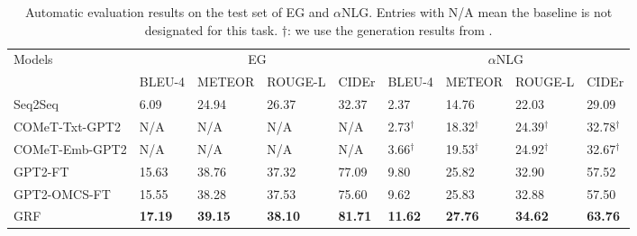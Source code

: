 \documentclass[11pt,a4paper]{article}
\begin{document}
\begin{table}[t]
    \centering
    \small
    \begin{tabular}{l llll llll}
    \toprule[1.5pt]
    \multirow{2}{*}{Models} & \multicolumn{4}{c}{EG} & \multicolumn{4}{c}{$\alpha$NLG} \\
    \cmidrule(lr){2-5} \cmidrule(lr){6-9}
    {} & BLEU-4 & METEOR & ROUGE-L & CIDEr & BLEU-4 & METEOR & ROUGE-L & CIDEr\\
    \midrule[1pt]
    Seq2Seq & 6.09 & 24.94 & 26.37 & 32.37 & 2.37 & 14.76 & 22.03 & 29.09\\
    COMeT-Txt-GPT2 & N/A & N/A & N/A & N/A & 2.73$^\dagger$ & 18.32$^\dagger$ & 24.39$^\dagger$ & 32.78$^\dagger$ \\
    COMeT-Emb-GPT2 & N/A & N/A & N/A & N/A & 3.66$^\dagger$ & 19.53$^\dagger$ & 24.92$^\dagger$ & 32.67$^\dagger$ \\
    GPT2-FT  & 15.63 & 38.76 & 37.32 & 77.09 & 9.80 & 25.82 & 32.90 & 57.52 \\
    GPT2-OMCS-FT & 15.55 & 38.28 & 37.53 & 75.60 & 9.62 & 25.83 & 32.88 & 57.50 \\
    \midrule[0.5pt]
    GRF & \textbf{17.19} & \textbf{39.15} & \textbf{38.10} & \textbf{81.71}  & \textbf{11.62} & \textbf{27.76} & \textbf{34.62} & \textbf{63.76}\\
    \bottomrule[1.5pt]
    \end{tabular}
    \caption{Automatic evaluation results on the test set of EG and $\alpha$NLG. Entries with N/A mean the baseline is not designated for this task. $\dagger$: we use the generation results from \citet{Bhagavatula2019AbductiveCR}.}
    \label{tab:auto-eval-1}
\end{table}
\end{document}
